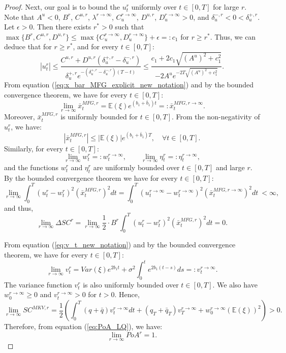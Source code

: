 \documentclass[11pt]{article}
\begin{document}
\begin{proof}
	Next, our goal is to bound the $u^r_t$ uniformly over $t \in [0,T]$ for large $r$.
	Note that  $A^u < 0$, $B^r$, $C^{u,r}$, $\lambda^{r\to \infty}$, $C^{r \to \infty}_u$, $D^{u,r}$, $D^{r \to \infty}_u> 0$, and $\delta^{-,r}_u < 0 < \delta^{+,r}_u$. Let $\epsilon>0$. Then there exists $r^*>0$ such that $\max\{ B^{r}, C^{u,r}, D^{u,r} \} \leq \max\{C^{r \to \infty}_u,D^{r \to \infty}_u \}+\epsilon=: c_1$ for $r \geq r^*$. Thus, we can deduce that for $r \geq r^*$, and for every $t \in [0,T]$:
	\begin{equation*}
	\left\vert u_t^{r} \right\vert \leq \frac{C^{u,r} + D^{u,r} (\delta^{+,r}_u - \delta^{-,r}_u)}{\delta^{+,r}_u e^{- (\delta^{+,r}_u - \delta^{-,r}_u)(T-t)}} 
	\leq  \frac{ c_1 + 2 c_1 \sqrt{(A^u)^2 + c_1^2}  }{-2A^u e^{-2T \sqrt{(A^u)^2 + c_1^2} } }.
	\end{equation*}
	From equation (\ref{eq:x_bar_MFG_explicit_new_notation}) and by the bounded convergence theorem, we have for every $t \in [0,T]$:
	\begin{equation*}
		\lim_{r\to \infty}\bar{x}_t^{MFG,r} = \mathbb{E}(\xi) e^{(b_1+ \bar{b}_1)t} =: \bar{x}_t^{MFG,r\to \infty}.
	\end{equation*}
	Moreover, $\bar{x}_t^{MFG,r}$ is uniformly bounded for $t \in [0,T]$. From the non-negativity of $u^r_t$, we have:
	$$ \left\vert \bar{x}^{MFG,r}_t \right\vert \leq \vert \mathbb{E}(\xi) \vert e^{ (b_1 + \bar{b}_1 ) T }, \quad \forall t \in [0,T]. $$  	
	Similarly, for every $t\in [0,T]$:
	$$\lim_{r\to \infty}w^r_t =: w_t^{r\to \infty},\qquad \lim_{r\to \infty} \eta^r_t =: \eta_t^{r\to \infty},$$
	and the functions $w^{r}_t$ and $\eta^{r}_t$ are uniformly bounded over $t \in[0,T]$ and large $r$. By the bounded convergence theorem we have for every $t \in [0,T]$:
	\begin{equation*}
	\lim_{r \to \infty} \int_0^T (u^r_t - w^r_t)^2 (\bar{x}_t^{MFG,r})^2 dt = \int_0^T (u^{r \to \infty}_t- w^{r \to \infty}_t)^2 (\bar{x}_t^{MFG,r\to \infty})^2 dt \  < \infty,
	\end{equation*}
	and thus,
	\begin{equation*}
	\lim_{r \to \infty} \Delta SC^r = \lim_{r \to \infty} \frac{1}{2}\cdot B^r\int_0^T (u^r_t - w^r_t)^2 ( \bar{x}_t^{MFG,r})^2 dt = 0.
	\end{equation*}
	
	From equation (\ref{eq:v_t_new_notation}) and by the bounded convergence theorem, we have for every $t \in [0,T]$: 
	$$	\lim_{r\to \infty} v^r_t = Var(\xi)e^{2b_1 t} + \sigma^2 \int_0^t e^{2 b_1 (t-s) } ds =: v^{r \to \infty}_t.
	$$
	The variance function $v_t^{r}$ is also uniformly bounded over $t \in [0,T]$. We also have $w^{r \to \infty }_0\geq0$ and $v^{r \to \infty}_t >0$ for $t>0$. Hence,
	\begin{equation*}
		\lim_{r \to \infty} SC^{MKV,r} = \frac{1}{2} \left( \int_0^T (q+\bar{q}) v^{r \to \infty}_t dt + (q_T + \bar{q}_T) v^{r\to \infty}_T + w^{r \to \infty}_0 (\mathbb{E}(\xi))^2 \right)  >0.
	\end{equation*}
	Therefore, from equation (\ref{eq:PoA_LQ}), we have: 
	$$\displaystyle \lim_{r \to \infty} PoA^r = 1.$$
	

\end{proof}
\end{document}
